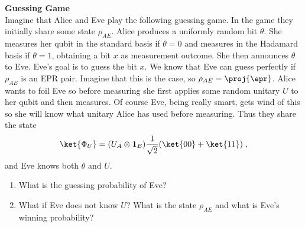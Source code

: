 \begin{exercises}
\item {\bf Guessing Game}\\
Imagine that Alice and Eve play the following guessing game. In the game they initially share some state $\rho_{AE}$. Alice produces a uniformly random bit $\theta$. She measures her qubit in the standard basis if $\theta=0$ and measures in the Hadamard basis if $\theta=1$, obtaining a bit $x$ as measurement outcome. She then announces $\theta$ to Eve. Eve's goal is to guess the bit $x$. We know that Eve can guess perfectly if $\rho_{AE}$ is an EPR pair. Imagine that this is the case, so $\rho_{AE} = \proj{\epr}$. Alice wants to foil Eve so before measuring she first applies some random unitary $U$ to her qubit and then measures. Of course Eve, being really smart, gets wind of this so she will know what unitary Alice has used before measuring. Thus they share the state
\begin{equation}
\ket{\Phi_U} = (U_A\otimes \mathbf{1}_E)\frac{1}{\sqrt{2}}(\ket{00}+ \ket{11})\;,
\end{equation}
and Eve knows both $\theta$ and $U$.
\begin{enumerate}
\item What is the guessing probability of Eve? 
\item What if Eve does not know $U$? What is the state $\rho_{AE}$ and what is Eve's winning probability?
\end{enumerate}


\end{exercises}
